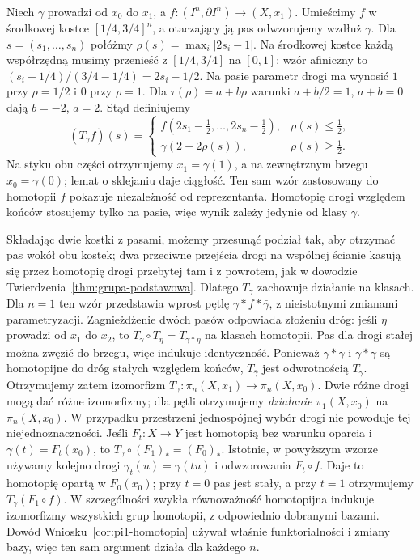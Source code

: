\begin{uwaga}
Niech $\gamma$ prowadzi od $x_0$ do $x_1$, a
$f:(I^n,\partial I^n)\to(X,x_1)$.
Umieścimy $f$ w środkowej kostce $[1/4,3/4]^n$,
a otaczający ją pas odwzorujemy wzdłuż $\gamma$.
Dla $s=(s_1,\ldots,s_n)$ połóżmy
$\rho(s)=\max_i|2s_i-1|$.
Na środkowej kostce każdą współrzędną musimy przenieść
z $[1/4,3/4]$ na $[0,1]$; wzór afiniczny to
$(s_i-1/4)/(3/4-1/4)=2s_i-1/2$.
Na pasie parametr drogi ma wynosić $1$ przy $\rho=1/2$
i $0$ przy $\rho=1$. Dla $\tau(\rho)=a+b\rho$
warunki $a+b/2=1$, $a+b=0$ dają $b=-2$, $a=2$.
Stąd definiujemy
\[
 (T_\gamma f)(s)=
 \begin{cases}
 f(2s_1-\tfrac12,\ldots,2s_n-\tfrac12),&\rho(s)\leq\tfrac12,\\
 \gamma(2-2\rho(s)),&\rho(s)\geq\tfrac12.
 \end{cases}
\]
Na styku obu części otrzymujemy $x_1=\gamma(1)$,
a na zewnętrznym brzegu $x_0=\gamma(0)$; lemat o sklejaniu
daje ciągłość. Ten sam wzór zastosowany do homotopii $f$
pokazuje niezależność od reprezentanta.
Homotopię drogi względem końców stosujemy tylko na pasie,
więc wynik zależy jedynie od klasy $\gamma$.

Składając dwie kostki z pasami, możemy przesunąć podział
tak, aby otrzymać pas wokół obu kostek; dwa przeciwne przejścia
drogi na wspólnej ścianie kasują się przez homotopię
drogi przebytej tam i z powrotem, jak w dowodzie
Twierdzenia~\ref{thm:grupa-podstawowa}.
Dlatego $T_\gamma$ zachowuje działanie na klasach.
Dla $n=1$ ten wzór przedstawia wprost pętlę
$\gamma*f*\bar\gamma$, z nieistotnymi zmianami parametryzacji.
Zagnieżdżenie dwóch pasów odpowiada złożeniu dróg:
jeśli $\eta$ prowadzi od $x_1$ do $x_2$, to
$T_\gamma\circ T_\eta=T_{\gamma*\eta}$ na klasach homotopii.
Pas dla drogi stałej można zwęzić do brzegu, więc indukuje identyczność.
Ponieważ $\gamma*\bar\gamma$ i $\bar\gamma*\gamma$ są homotopijne
do dróg stałych względem końców, $T_{\bar\gamma}$ jest odwrotnością $T_\gamma$.
Otrzymujemy zatem izomorfizm
$T_\gamma:\pi_n(X,x_1)\to\pi_n(X,x_0)$.
Dwie różne drogi mogą dać różne izomorfizmy; dla pętli
otrzymujemy \emph{działanie} $\pi_1(X,x_0)$ na $\pi_n(X,x_0)$.
W przypadku przestrzeni jednospójnej wybór drogi
nie powoduje tej niejednoznaczności.
Jeśli $F_t:X\to Y$ jest homotopią bez warunku oparcia i
$\gamma(t)=F_t(x_0)$, to
$T_\gamma\circ(F_1)_*=(F_0)_*$.
Istotnie, w powyższym wzorze używamy kolejno drogi
$\gamma_t(u)=\gamma(tu)$ i odwzorowania $F_t\circ f$.
Daje to homotopię opartą w $F_0(x_0)$; przy $t=0$ pas jest stały,
a przy $t=1$ otrzymujemy $T_\gamma(F_1\circ f)$.
W szczególności zwykła równoważność homotopijna indukuje
izomorfizmy wszystkich grup homotopii, z odpowiednio dobranymi bazami.
Dowód Wniosku~\ref{cor:pi1-homotopia} używał właśnie
funktorialności i zmiany bazy, więc ten sam argument działa dla każdego $n$.
\end{uwaga}

